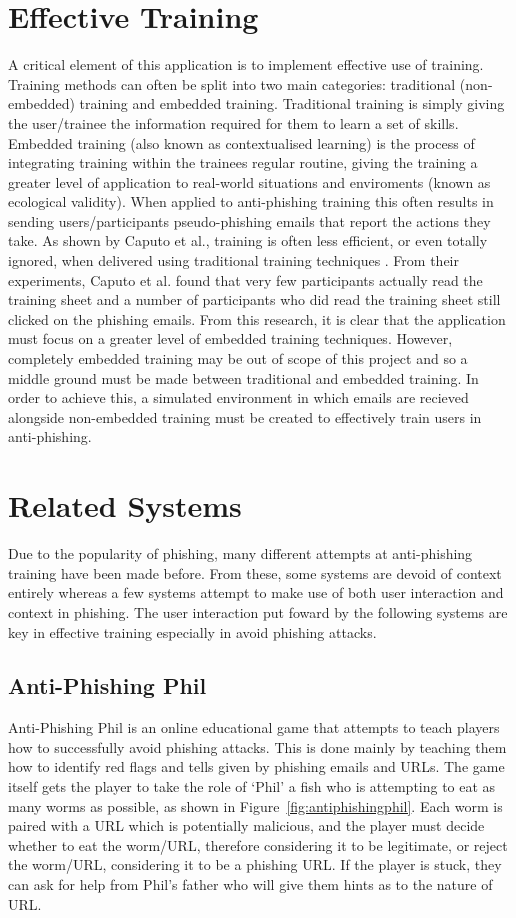 \documentclass{l4proj}
\begin{document}
\section{Effective Training}
A critical element of this application is to implement effective use of training. Training methods can often be split into two main categories: traditional (non-embedded) training and embedded training. Traditional training is simply giving the user/trainee the information required for them to learn a set of skills. Embedded training (also known as contextualised learning) is the process of integrating training within the trainees regular routine, giving the training a greater level of application to real-world situations and enviroments (known as ecological validity). When applied to anti-phishing training this often results in sending users/participants pseudo-phishing emails that report the actions they take. As shown by Caputo et al., training is often less efficient, or even totally ignored, when delivered using traditional training techniques \citep{caputo2014embedded}. From their experiments, Caputo et al. found that very few participants actually read the training sheet and a number of participants who did read the training sheet still clicked on the phishing emails. From this research, it is clear that the application must focus on a greater level of embedded training techniques. However, completely embedded training may be out of scope of this project and so a middle ground must be made between traditional and embedded training. In order to achieve this, a simulated environment in which emails are recieved alongside non-embedded training must be created to effectively train users in anti-phishing.


\section{Related Systems}
Due to the popularity of phishing, many different attempts at anti-phishing training have been made before. From these, some systems are devoid of context entirely whereas a few systems attempt to make use of both user interaction and context in phishing. The user interaction put foward by the following systems are key in effective training especially in avoid phishing attacks.

\subsection{Anti-Phishing Phil}
Anti-Phishing Phil \citep{sheng2007anti} is an online educational game that attempts to teach players how to successfully avoid phishing attacks. This is done mainly by teaching them how to identify red flags and tells given by phishing emails and URLs. The game itself gets the player to take the role of ‘Phil’ a fish who is attempting to eat as many worms as possible, as shown in Figure~\ref{fig:antiphishingphil}. Each worm is paired with a URL which is potentially malicious, and the player must decide whether to eat the worm/URL, therefore considering it to be legitimate, or reject the worm/URL, considering it to be a phishing URL. If the player is stuck, they can ask for help from Phil’s father who will give them hints as to the nature of URL. 
\end{document}
